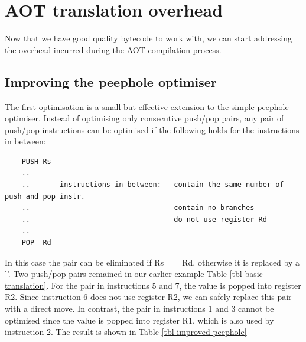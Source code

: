\section{AOT translation overhead}
\label{sec-optimisations-aot-translation-overhead}
Now that we have good quality bytecode to work with, we can start addressing the overhead incurred during the AOT compilation process.

\subsection{Improving the peephole optimiser}
\label{sec-improved-peephole}


The first optimisation is a small but effective extension to the simple peephole optimiser. Instead of optimising only consecutive push/pop pairs, any pair of push/pop instructions can be optimised if the following holds for the instructions in between:

\begin{listing}
    \begin{verbatim}
    PUSH Rs
    ..
    ..       instructions in between: - contain the same number of push and pop instr.
    ..                                - contain no branches
    ..                                - do not use register Rd
    ..
    POP  Rd
     \end{verbatim}
\end{listing}

In this case the pair can be eliminated if Rs == Rd, otherwise it is replaced by a ''. Two push/pop pairs remained in our earlier example Table \ref{tbl-basic-translation}. For the pair in instructions 5 and 7, the value is popped into register R2. Since instruction 6 does not use register R2, we can safely replace this pair with a direct move. In contrast, the pair in instructions 1 and 3 cannot be optimised since the value is popped into register R1, which is also used by instruction 2. The result is shown in Table \ref{tbl-improved-peephole}

